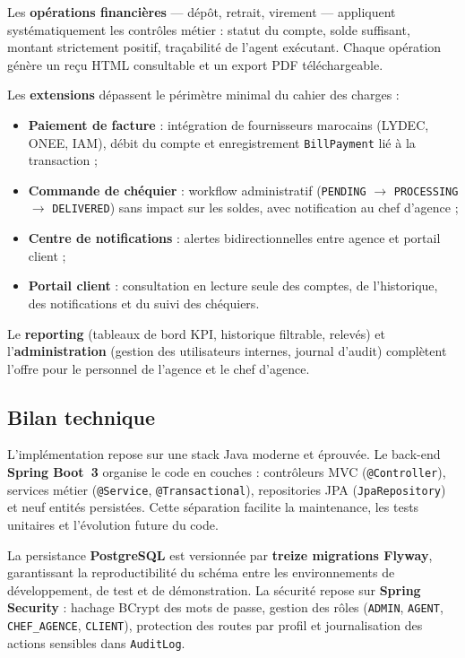\documentclass[11pt,a4paper,oneside]{report}
\begin{document}
Les \textbf{opérations financières} --- dépôt, retrait, virement --- appliquent systématiquement les contrôles métier : statut du compte, solde suffisant, montant strictement positif, traçabilité de l'agent exécutant. Chaque opération génère un reçu HTML consultable et un export PDF téléchargeable.

Les \textbf{extensions} dépassent le périmètre minimal du cahier des charges :
\begin{itemize}
    \item \textbf{Paiement de facture} : intégration de fournisseurs marocains (LYDEC, ONEE, IAM), débit du compte et enregistrement \texttt{BillPayment} lié à la transaction ;
    \item \textbf{Commande de chéquier} : workflow administratif (\texttt{PENDING} $\rightarrow$ \texttt{PROCESSING} $\rightarrow$ \texttt{DELIVERED}) sans impact sur les soldes, avec notification au chef d'agence ;
    \item \textbf{Centre de notifications} : alertes bidirectionnelles entre agence et portail client ;
    \item \textbf{Portail client} : consultation en lecture seule des comptes, de l'historique, des notifications et du suivi des chéquiers.
\end{itemize}

Le \textbf{reporting} (tableaux de bord KPI, historique filtrable, relevés) et l'\textbf{administration} (gestion des utilisateurs internes, journal d'audit) complètent l'offre pour le personnel de l'agence et le chef d'agence.

\subsection*{Bilan technique}

L'implémentation repose sur une stack Java moderne et éprouvée. Le back-end \textbf{Spring Boot~3} organise le code en couches : contrôleurs MVC (\texttt{@Controller}), services métier (\texttt{@Service}, \texttt{@Transactional}), repositories JPA (\texttt{JpaRepository}) et neuf entités persistées. Cette séparation facilite la maintenance, les tests unitaires et l'évolution future du code.

La persistance \textbf{PostgreSQL} est versionnée par \textbf{treize migrations Flyway}, garantissant la reproductibilité du schéma entre les environnements de développement, de test et de démonstration. La sécurité repose sur \textbf{Spring Security} : hachage BCrypt des mots de passe, gestion des rôles (\texttt{ADMIN}, \texttt{AGENT}, \texttt{CHEF\_AGENCE}, \texttt{CLIENT}), protection des routes par profil et journalisation des actions sensibles dans \texttt{AuditLog}.
\end{document}
